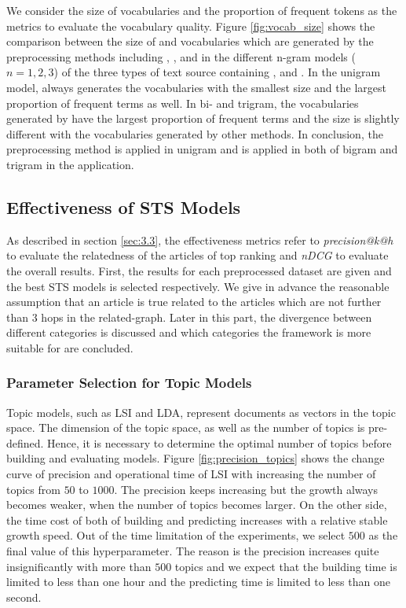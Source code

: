 We consider the size of \ifull{} vocabularies and the proportion of frequent tokens as the metrics to evaluate the vocabulary quality. Figure \ref{fig:vocab_size} shows the comparison between the size of \ifull{} and \icommon{} vocabularies which are generated by the preprocessing methods including \iSP{}, \iSE{}, \iST{} and \iSS{} in the different n-gram models ($n=1, 2, 3$) of the three types of text source containing \icontent{}, \ititle{} and \isummary{}. In the unigram model, \iSS{} always generates the vocabularies with the smallest size and the largest proportion of frequent terms as well. In bi- and trigram, the vocabularies generated by \iSE{} have the largest proportion of frequent terms and the size is slightly different with the vocabularies generated by other methods. In conclusion, the preprocessing method \iSS{} is applied in unigram and \iSE{} is applied in both of bigram and trigram in the application. 



\subsection{Effectiveness of STS Models}
\label{sec:5.2}

As described in section \ref{sec:3.3}, the effectiveness metrics refer to \textit{precision@k@h} to evaluate the relatedness of the articles of top ranking and \textit{nDCG} to evaluate the overall results. First, the results for each preprocessed dataset are given and the best STS models is selected respectively. We give in advance the reasonable assumption that an article is true related to the articles which are not further than $3$ hops in the related-graph. Later in this part, the divergence between different categories is discussed and which categories the framework is more suitable for are concluded.  

\subsubsection{Parameter Selection for Topic Models}

Topic models, such as LSI and LDA, represent documents as vectors in the topic space. The dimension of the topic space, as well as the number of topics is pre-defined. Hence, it is necessary to determine the optimal number of topics before building and evaluating models. Figure \ref{fig:precision_topics} shows the change curve of precision and operational time of LSI with increasing the number of topics from $50$ to $1000$. The precision keeps increasing but the growth always becomes weaker, when the number of topics becomes larger. On the other side, the time cost of both of building and predicting increases with a relative stable growth speed. Out of the time limitation of the experiments, we select $500$ as the final value of this hyperparameter. The reason is the precision increases quite insignificantly with more than $500$ topics and we expect that the building time is limited to less than one hour and the predicting time is limited to less than one second. 

